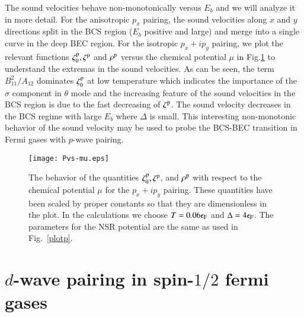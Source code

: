 \documentclass[aps,prd,amsmath,two column,nofootinbib,amssymb,referee]{revtex4}
\begin{document}
The sound velocities behave non-monotonically versus $E_b$ and we will analyze it in more detail. For the anisotropic $p_x$ pairing, the sound velocities along $x$ and $y$ directions split in the BCS region 
($E_b$ positive and large) and merge into a single curve in the deep BEC region. For the isotropic $p_x+ip_y$ pairing, we plot the relevant functions $\zeta_0^{\rm p},\zeta^{\rm p}$ and $\rho^{\rm p}$ versus the chemical potential $\mu$ in Fig.\ref{Pvs} to understand the extremas in the sound velocities. As can be seen, the term $B_{11}^2/A_{12}$ dominates $\zeta_0^{\rm p}$ at low temperature which indicates the importance of the $\sigma$ component in $\theta$ mode and the increasing feature of the sound velocities in the BCS region is due to the fast decreasing of $\zeta^{\rm p}$. The sound velocity decreases in the BCS regime with large $E_b$ where $\Delta$ is small. This interesting non-monotonic behavior of the sound velocity may be used to probe the BCS-BEC transition in Fermi gases with $p$-wave pairing.

\begin{figure}[!htb]
\centering
\texttt{[image: Pvs-mu.eps]}
\caption{The behavior of the quantities $\zeta_0^{\rm p},\zeta^{\rm p}$, and $\rho^{\rm p}$ with respect to the chemical potential $\mu$ for the $p_x+ip_y$ pairing. These quantities have been scaled by proper constants so that they are dimensionless in the plot. In the calculations we choose $T=0.06\epsilon_{\rm F}$ and $\Delta=4\epsilon_{\rm F}$. The parameters for the NSR potential are the same as used in Fig.~\ref{plotp}.}\label{Pvs}
\end{figure}


\section{$d$-wave pairing in spin-$1/2$ fermi gases}\label{chapterd}
\end{document}
